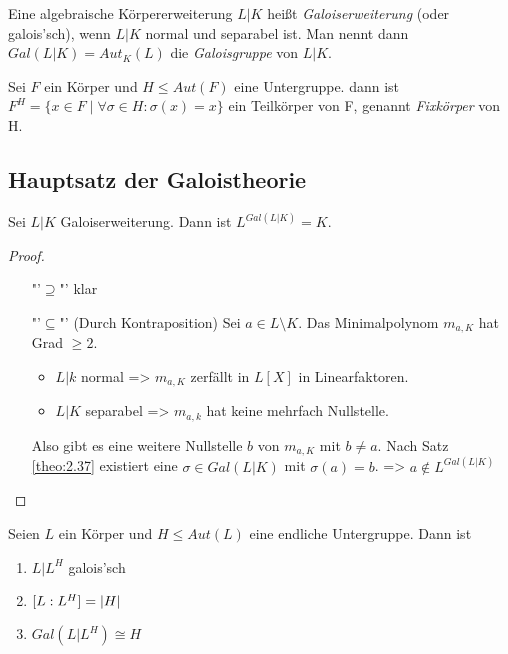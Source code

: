 \documentclass[../main.tex]{subfiles}
\begin{document}
\begin{definition}
    Eine algebraische Körpererweiterung $L|K$ heißt \emph{Galoiserweiterung} (oder galois'sch), wenn $L|K$ normal und separabel ist.
    Man nennt dann $Gal(L|K) = Aut_K(L)$ die \emph{Galoisgruppe} von $L|K$.

    Sei $F$ ein Körper und $H\leq Aut(F)$ eine Untergruppe.
    dann ist $F^H = \{x\in F\mid \forall\sigma\in H:\sigma(x) = x\}$ ein Teilkörper von F, genannt \emph{Fixkörper} von H.
\end{definition}
\subsection{Hauptsatz der Galoistheorie}
\begin{lemma} \label{theo:3.2}
    Sei $L|K$ Galoiserweiterung. Dann ist $L^{Gal(L|K)} = K$.
\end{lemma}
\begin{proof}$ $
    \begin{enumerate}
        \item["'$\supseteq$"'] klar
        \item["'$\subseteq$"'] (Durch Kontraposition) Sei $a\in L\setminus K$. Das Minimalpolynom $m_{a,K}$ hat Grad $\geq2$.
        \begin{itemize}
            \item $L|k$ normal => $m_{a,K}$ zerfällt in $L[X]$ in Linearfaktoren.
            \item $L|K$ separabel => $m_{a,k}$ hat keine mehrfach Nullstelle.
        \end{itemize}
    
        Also gibt es eine weitere Nullstelle $b$ von $m_{a,K}$ mit $b\neq a$.
        Nach Satz \cref{theo:2.37} existiert eine $\sigma \in Gal(L|K)$ mit $\sigma(a)=b$.
        => $a\notin L^{Gal(L|K)}$
    \end{enumerate}
\end{proof}
\begin{theorem} \label{theo:3.3}
    Seien $L$ ein Körper und $H\leq Aut(L)$ eine endliche Untergruppe.
    Dann ist
    \begin{enumerate}
        \item $L|L^H$ galois'sch
        \item $[L:L^H] = \left\vert H \right\vert$
        \item $Gal(L|L^H)\cong H$
    \end{enumerate}
\end{theorem}
\end{document}

